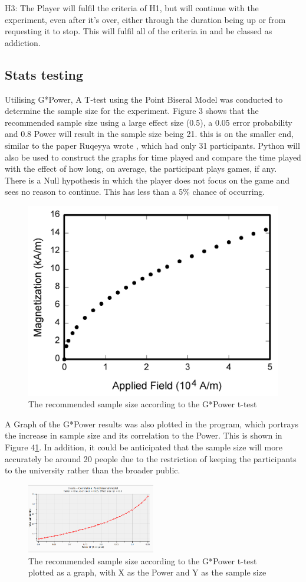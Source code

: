 \documentclass[conference]{IEEEtran}
\begin{document}
H3: The Player will fulfil the criteria of H1, but will continue with the experiment, even after it's over, either through the duration being up or from requesting it to stop. This will fulfil all of the criteria in \cite{NHSHamp24} and be classed as addiction. \\

\subsection{Stats testing}
Utilising G*Power, A T-test using the Point Biseral Model was conducted to determine the sample size for the experiment. Figure 3 shows that the recommended sample size using a large effect size (0.5), a 0.05 error probability and 0.8 Power will result in the sample size being 21.  this is on the smaller end, similar to the paper Ruqeyya wrote \cite{Ruqeyya2022}, which had only 31 participants.  Python will also be used to construct the graphs for time played and compare the time played with the effect of how long, on average, the participant plays games, if any.\\

There is a Null hypothesis in which the player does not focus on the game and sees no reason to continue. This has less than a 5\% chance of occurring. 
\begin{figure}[H]
\includegraphics[width =0.5 \textwidth]{fig1}
\caption{The recommended sample size according to the G*Power t-test}
\label{tab:figure4}
\end{figure}

A Graph of the G*Power results was also plotted in the program, which portrays the increase in sample size and its correlation to the Power. This is shown in Figure 4\ref{tab:figure4}. In addition, it could be anticipated that the sample size will more accurately be around 20 people due to the restriction of keeping the participants to the university rather than the broader public. 

\begin{figure}[H]
\includegraphics[width = 0.5\textwidth]{fig2}
\caption{The recommended sample size according to the G*Power t-test plotted as a graph, with X as the Power and Y as the sample size}
\label{tab:figure5}
\end{figure}
\end{document}
